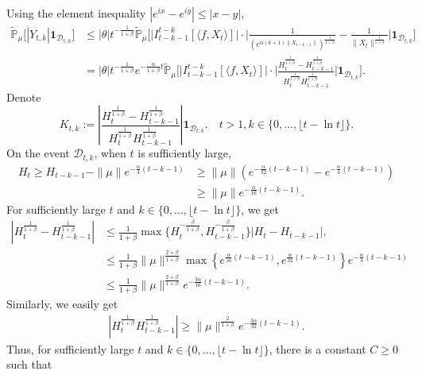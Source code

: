\documentclass[12pt,oneside,english]{amsart}
\theoremstyle{plain}
\theoremstyle{definition}
\numberwithin{equation}{section}
\begin{document}
    Using the element inequality $|e^{ix}-e^{iy}|\leq|x-y|$,
    \begin{align}
        \mathbb{\tilde{P}}_{\mu}\big[|Y_{t,k}|\mathbf{1}_{\mathcal{D}_{t,k}}\big]&\leq|\theta|t^{-\frac{1}{1+\beta}}\mathbb{\tilde{P}}_{\mu}\Big[\big|I_{t-k-1}^{t-k}[\langle f ,X_t\rangle]\big|\cdot\Big|\frac{1}{\left(e^{\alpha(k+1)\|X_{t-k-1}\|}\right)^{\frac{1}{1+\beta}}}-\frac{1}{\|X_t\|^{\frac{1}{1+\beta}}}\Big|\mathbf{1}_{\mathcal{D}_{t,k}}\Big]\\
        \label{ineq: control of Ykt}
        &=|\theta|t^{-\frac{1}{1+\beta}}e^{-\frac{\alpha}{1+\beta}t}\mathbb{\tilde{P}}_{\mu}\Big[\big|I_{t-k-1}^{t-k}[\langle f ,X_t\rangle]\big|\cdot\Big|\frac{H_t^{\frac{1}{1+\beta}}-H_{t-k-1}^{\frac{1}{1+\beta}}}{H_t^{\frac{1}{1+\beta}}H_{t-k-1}^{\frac{1}{1+\beta}}}\Big|\mathbf{1}_{\mathcal{D}_{t,k}}\Big].
    \end{align}
Denote
$$K_{t,k}:=\left|\frac{H_t^{\frac{1}{1+\beta}}-H_{t-k-1}^{\frac{1}{1+\beta}}}{H_t^{\frac{1}{1+\beta}}H_{t-k-1}^{\frac{1}{1+\beta}}}\right|\mathbf{1}_{\mathcal{D}_{t,k}}.\quad t>1, k\in \{0,...,\lfloor t-\ln t\rfloor\}.$$
 On the event $\mathcal{D}_{t,k}$, when $t$ is sufficiently large,
 \begin{align*}
     H_t\geq H_{t-k-1}-\|\mu\| e^{-\frac{\alpha}{4}(t-k-1)}&\geq\|\mu\|\left(e^{-\frac{\alpha}{32}(t-k-1)}-e^{-\frac{\alpha}{4}(t-k-1)}\right)\\
     &\geq \|\mu\| e^{-\frac{\alpha}{16}(t-k-1)}.
 \end{align*}
 For sufficiently large $t$ and $k\in \{0,...,\lfloor t-\ln t\rfloor\}$, we get
 \begin{align*}
     \left|H_t^{\frac{1}{1+\beta}}-H_{t-k-1}^{\frac{1}{1+\beta}}\right|
     &\leq \frac{1}{1+\beta}\max \Big\{H_t^{-\frac{\beta}{1+\beta}},H_{t-k-1}^{-\frac{\beta}{1+\beta}}\Big\}\left|H_t-H_{t-k-1}\right|,
    \\&\leq \frac{1}{1+\beta}\|\mu\|^{\frac{2+\beta}{1+\beta}} \max\left\{e^{\frac{\alpha}{16}(t-k-1)}, e^{\frac{\alpha}{32}(t-k-1)}\right\}e^{-\frac{\alpha}{4}(t-k-1)}\\
    &\leq\frac{1}{1+\beta}\|\mu\|^{\frac{2+\beta}{1+\beta}}  e^{-\frac{3\alpha}{16}(t-k-1)}.
\end{align*}
Similarly, we easily get 
\begin{align*}
    \left|H_t^{\frac{1}{1+\beta}}H_{t-k-1}^{\frac{1}{1+\beta}}\right|\geq \|\mu\|^{\frac{2}{1+\beta}} e^{-\frac{3\alpha}{32}(t-k-1)}.
\end{align*}
Thus, for sufficiently large  $t$ and $k\in \{0,...,\lfloor t-\ln t\rfloor\}$, there is a constant $C\geq 0$ such that
\end{document}
